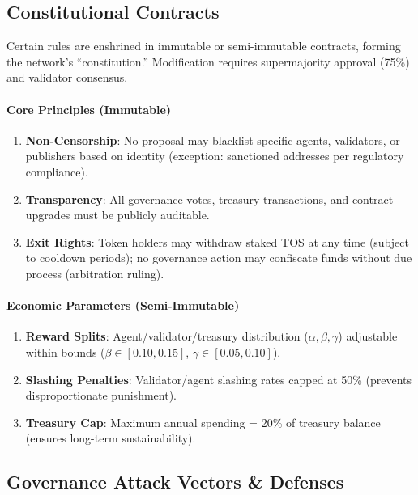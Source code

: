 \documentclass[11pt]{article}
\begin{document}
\subsection{Constitutional Contracts}

Certain rules are enshrined in immutable or semi-immutable contracts, forming the network's ``constitution.'' Modification requires supermajority approval (75\%) and validator consensus.

\paragraph{Core Principles (Immutable)}
\begin{enumerate}[noitemsep]
  \item \textbf{Non-Censorship}: No proposal may blacklist specific agents, validators, or publishers based on identity (exception: sanctioned addresses per regulatory compliance).
  \item \textbf{Transparency}: All governance votes, treasury transactions, and contract upgrades must be publicly auditable.
  \item \textbf{Exit Rights}: Token holders may withdraw staked TOS at any time (subject to cooldown periods); no governance action may confiscate funds without due process (arbitration ruling).
\end{enumerate}

\paragraph{Economic Parameters (Semi-Immutable)}
\begin{enumerate}[noitemsep]
  \item \textbf{Reward Splits}: Agent/validator/treasury distribution ($\alpha, \beta, \gamma$) adjustable within bounds ($\beta \in [0.10, 0.15]$, $\gamma \in [0.05, 0.10]$).
  \item \textbf{Slashing Penalties}: Validator/agent slashing rates capped at 50\% (prevents disproportionate punishment).
  \item \textbf{Treasury Cap}: Maximum annual spending = 20\% of treasury balance (ensures long-term sustainability).
\end{enumerate}

\subsection{Governance Attack Vectors \& Defenses}
\end{document}
